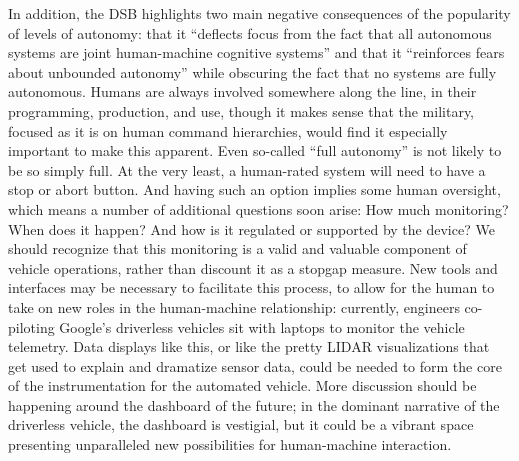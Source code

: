 In addition, the DSB highlights two main negative consequences of the popularity of
levels of autonomy: that it ``deflects focus from the fact that all
autonomous systems are joint human-machine cognitive systems''\cite{???} and
that it ``reinforces fears about unbounded autonomy'' while obscuring
the fact that no systems are fully autonomous\cite{???}. Humans are always
involved somewhere along the line, in their programming, production,
and use, though it makes sense that the military, focused as it is on
human command hierarchies, would find it especially important to make
this apparent. Even so-called ``full autonomy'' is not likely to be so
simply full. At the very least, a human-rated system will need to have
a stop or abort button. And having such an option implies some human
oversight, which means a number of additional questions soon arise:
How much monitoring? When does it happen? And how is it
regulated or supported by the device? We should recognize that this
monitoring is a valid and valuable component of vehicle operations,
rather than discount it as a stopgap measure. New tools and interfaces
may be necessary to facilitate this process, to allow for the human to
take on new roles in the human-machine relationship: currently, engineers
co-piloting Google's driverless vehicles sit with laptops to monitor
the vehicle telemetry\cite{???-article-from-DM-class}. Data displays
like this, or like the pretty LIDAR visualizations that get used to
explain and dramatize sensor data, could be needed to form the core of the
instrumentation for the automated vehicle. More discussion should be
happening around the dashboard of the future; in the dominant
narrative of the driverless vehicle, the dashboard is vestigial, but
it could be a vibrant space presenting unparalleled new possibilities
for human-machine interaction.

